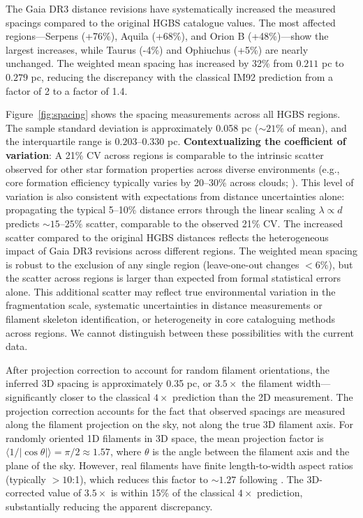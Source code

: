 \documentclass[twocolumn,usenatbib]{mnras}
\begin{document}
The Gaia DR3 distance revisions have systematically increased the measured spacings compared to the original HGBS catalogue values. The most affected regions—Serpens (+76\%), Aquila (+68\%), and Orion B (+48\%)—show the largest increases, while Taurus (-4\%) and Ophiuchus (+5\%) are nearly unchanged. The weighted mean spacing has increased by 32\% from $0.211$ pc to $0.279$ pc, reducing the discrepancy with the classical IM92 prediction from a factor of 2 to a factor of 1.4.

Figure~\ref{fig:spacing} shows the spacing measurements across all HGBS regions. The sample standard deviation is approximately 0.058 pc ($\sim21\%$ of mean), and the interquartile range is $0.203$--$0.330$ pc. \textbf{Contextualizing the coefficient of variation}: A 21\% CV across regions is comparable to the intrinsic scatter observed for other star formation properties across diverse environments (e.g., core formation efficiency typically varies by 20--30\% across clouds; \citet{Molinari2022}). This level of variation is also consistent with expectations from distance uncertainties alone: propagating the typical 5--10\% distance errors through the linear scaling $\lambda \propto d$ predicts $\sim15$--$25\%$ scatter, comparable to the observed 21\% CV. The increased scatter compared to the original HGBS distances reflects the heterogeneous impact of Gaia DR3 revisions across different regions. The weighted mean spacing is robust to the exclusion of any single region (leave-one-out changes $<6\%$), but the scatter across regions is larger than expected from formal statistical errors alone. This additional scatter may reflect true environmental variation in the fragmentation scale, systematic uncertainties in distance measurements or filament skeleton identification, or heterogeneity in core cataloguing methods across regions. We cannot distinguish between these possibilities with the current data.

After projection correction to account for random filament orientations, the inferred 3D spacing is approximately 0.35 pc, or $3.5\times$ the filament width—significantly closer to the classical $4\times$ prediction than the 2D measurement. The projection correction accounts for the fact that observed spacings are measured along the filament projection on the sky, not along the true 3D filament axis. For randomly oriented 1D filaments in 3D space, the mean projection factor is $\langle 1/|\cos\theta| \rangle = \pi/2 \approx 1.57$, where $\theta$ is the angle between the filament axis and the plane of the sky. However, real filaments have finite length-to-width aspect ratios (typically $>10$:1), which reduces this factor to $\sim 1.27$ following \citet{Hacar2013}. The 3D-corrected value of $3.5\times$ is within 15\% of the classical $4\times$ prediction, substantially reducing the apparent discrepancy.
\end{document}
